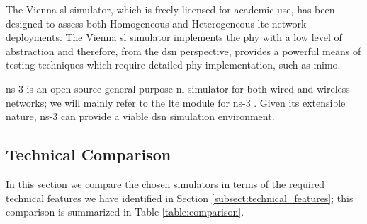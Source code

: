 \documentclass[conference]{IEEEtran}
\begin{document}
The Vienna \ac{sl} simulator, which is freely licensed for academic use, has been designed to assess both Homogeneous and Heterogeneous \ac{lte} network deployments. The Vienna \ac{sl} simulator implements the \ac{phy} with a low level of abstraction and therefore, from the \ac{dsn} perspective, provides a powerful means of testing techniques which require detailed \ac{phy} implementation, such as \ac{mimo}.

ns-3 is an open source general purpose \ac{nl} simulator for both wired and wireless networks; we will mainly refer to the \ac{lte} module for ns-3 \cite{Piro2011}. Given its extensible nature, ns-3 can provide a viable \ac{dsn} simulation environment.



\subsection{Technical Comparison}\label{subsect:technical}

In this section we compare the chosen simulators in terms of the required technical features we have identified in Section \ref{subsect:technical_features}; this comparison is summarized in Table \ref{table:comparison}.
\end{document}
